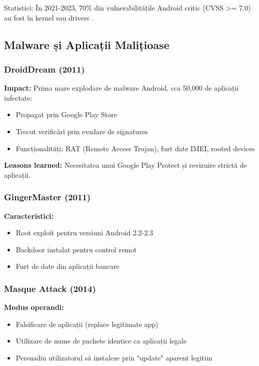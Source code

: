 \documentclass[11pt,a4paper,twocolumn]{article}
\theoremstyle{definition}
\theoremstyle{plain}
\theoremstyle{remark}
\begin{document}
Statistici: În 2021-2023, 70\% din vulnerabilitățile Android critic (CVSS >= 7.0) 
au fost în kernel sau drivers \cite{android_cves}.

\subsection{Malware și Aplicații Malițioase}

\subsubsection{DroidDream (2011)}
\textbf{Impact:} Prima mare explodare de malware Android, cca 50,000 de aplicații infectate:
\begin{itemize}
    \item Propagat prin Google Play Store
    \item Trecut verificări prin evadare de signatures
    \item Funcționalități: RAT (Remote Access Trojan), furt date IMEI, rooted devices
\end{itemize}

\textbf{Leasons learned:} Necesitatea unui Google Play Protect și revizuire strictă de aplicații.

\subsubsection{GingerMaster (2011)}
\textbf{Caracteristici:}
\begin{itemize}
    \item Root exploit pentru versiuni Android 2.2-2.3
    \item Backdoor instalat pentru control remot
    \item Furt de date din aplicații bancare
\end{itemize}

\subsubsection{Masque Attack (2014)}
\textbf{Modus operandi:}
\begin{itemize}
    \item Falsificare de aplicații (replace legitimate app)
    \item Utilizare de nume de pachete identice ca aplicații legale
    \item Persuadiu utilizatorul să instaleze prin "update" aparent legitim
\end{itemize}
\end{document}
